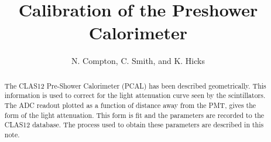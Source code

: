 \documentclass[letterpaper,10pt]{article}
\title{Calibration of the Preshower Calorimeter}
\author{N. Compton, C. Smith, and K. Hicks}
\begin{document}
\maketitle

\begin{abstract}
The CLAS12 Pre-Shower Calorimeter (PCAL) has been described geometrically. 
This information is used to correct for the light attenuation curve seen by the scintillators. 
The ADC readout plotted as a function of distance away from the PMT, gives the form of the light attenuation. 
This form is fit and the parameters are recorded to the CLAS12 database. 
The process used to obtain these parameters are described in this note. 
\end{abstract}

\tableofcontents
\clearpage












\end{document}
